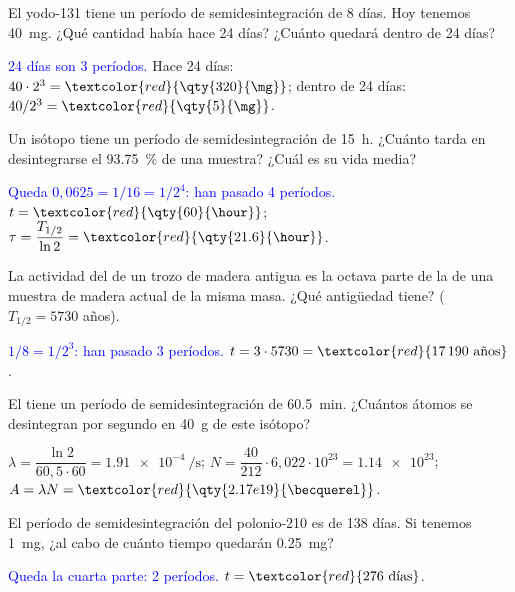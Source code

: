 \begin{exercise}
    El yodo-131 tiene un período de semidesintegración de 8 días. Hoy tenemos \qty{40}{\mg}. ¿Qué cantidad había hace 24 días? ¿Cuánto quedará
    dentro de 24 días?
    \begin{solu}
        \textcolor{blue}{24 días son 3 períodos.} Hace 24 días: \(40\cdot 2^3 = \textcolor{red}{\qty{320}{\mg}}\); dentro de 24 días: \(40/2^3 = \textcolor{red}{\qty{5}{\mg}}\).
    \end{solu}
\end{exercise}

\begin{exercise}
    Un isótopo tiene un período de semidesintegración de \qty{15}{\hour}. ¿Cuánto tarda en desintegrarse el \qty{93.75}{\percent} de una muestra?
    ¿Cuál es su vida media?
    \begin{solu}
        \textcolor{blue}{Queda \(0{,}0625 = 1/16 = 1/2^4\): han pasado 4 períodos.} \(t = \textcolor{red}{\qty{60}{\hour}}\); \(\tau = \dfrac{T_{1/2}}{\ln 2} = \textcolor{red}{\qty{21.6}{\hour}}\).
    \end{solu}
\end{exercise}

\begin{exercise}
    La actividad del  de un trozo de madera antigua es la octava parte de la de una muestra de madera actual de la misma masa. ¿Qué
    antigüedad tiene? (\(T_{1/2} = 5730\) años).
    \begin{solu}
        \textcolor{blue}{\(1/8 = 1/2^3\): han pasado 3 períodos.} \(t = 3\cdot 5730 = \textcolor{red}{17\,190\ \text{años}}\).
    \end{solu}
\end{exercise}

\begin{exercise}
    El  tiene un período de semidesintegración de \qty{60.5}{\minute}. ¿Cuántos átomos se desintegran por segundo en \qty{40}{\g} de este isótopo?
    \begin{solu}
        \(\lambda = \dfrac{\ln 2}{60{,}5\cdot 60} = \qty{1.91e-4}{\per\second}\); \(N = \dfrac{40}{212}\cdot 6{,}022\cdot 10^{23} = \num{1.14e23}\);
        \(A = \lambda N = \textcolor{red}{\qty{2.17e19}{\becquerel}}\).
    \end{solu}
\end{exercise}

\begin{exercise}
    El período de semidesintegración del polonio-210 es de 138 días. Si tenemos \qty{1}{\mg}, ¿al cabo de cuánto tiempo quedarán \qty{0.25}{\mg}?
    \begin{solu}
        \textcolor{blue}{Queda la cuarta parte: 2 períodos.} \(t = \textcolor{red}{276\ \text{días}}\).
    \end{solu}
\end{exercise}

